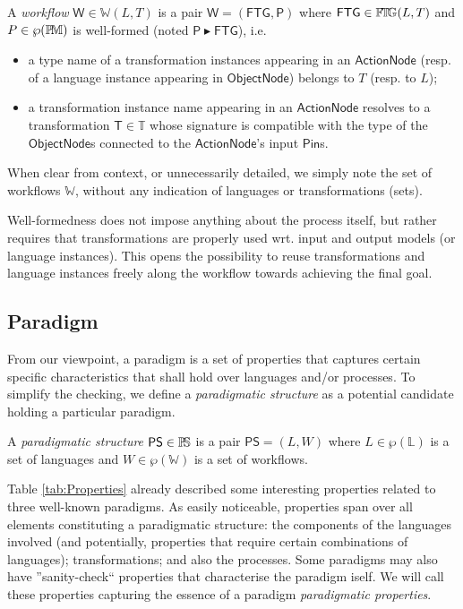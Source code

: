 \begin{Definition}[Workflow]
   A \emph{workflow} $\mathsf{W}\in\mathbb{W}(L, T)$ is a pair $\mathsf{W} = 
(\mathsf{FTG}, \mathsf{P})$ where $\mathsf{FTG}\in\mathbb{F}\!\mathbb{T}\!\mathbb{G}(L, T)$ and 
$P\in\wp(\mathbb{P}\!\mathbb{M})$ is well-formed (noted $\mathsf{P} \blacktriangleright 
\mathsf{FTG}$), i.e.
\begin{itemize}
   \item a type name of a transformation instances appearing in an
$\mathsf{ActionNode}$ (resp. of a language instance appearing in 
$\mathsf{ObjectNode}$) belongs to $T$ (resp. to $L$);
   \item a transformation instance name appearing in an $\mathsf{ActionNode}$
resolves to a transformation $\mathsf{T}\in\mathbb{T}$ whose signature is 
compatible with the type of the $\mathsf{ObjectNode}$s 
connected to the $\mathsf{ActionNode}$'s input $\mathsf{Pin}$s. 
\end{itemize}
\end{Definition}
\noindent
When clear from context, or unnecessarily detailed, we simply note the set of 
workflows $\mathbb{W}$, without any indication of languages or 
transformations (sets).

Well-formedness does not impose anything about the process itself, but rather 
requires that transformations are properly used wrt. input and output models 
(or language instances). This opens the possibility to reuse transformations 
and language instances freely along the workflow towards achieving the final 
goal.



\subsection{Paradigm}
\label{sec:PS}

From our viewpoint, a paradigm is a set of properties that captures 
certain specific characteristics that shall hold over languages and/or 
processes. To simplify the checking, we define a \emph{paradigmatic structure} 
as a potential candidate holding a particular paradigm.

\begin{Definition}
   A \emph{paradigmatic structure} $\mathsf{PS}\in \mathbb{P}\!\mathbb{S}$ is a pair $\mathsf{PS} 
= (L, W)$ where $L\in \wp(\mathbb{L})$ is a set of languages and 
$W \in \wp(\mathbb{W})$ is a set of workflows.
\end{Definition}

Table \ref{tab:Properties} already described some interesting properties 
related to three well-known paradigms. As easily noticeable, properties span 
over all elements constituting a paradigmatic structure: the components of the 
languages involved (and potentially, properties that require certain 
combinations of languages); transformations; and also the processes. Some 
paradigms may also have ''sanity-check`` properties that characterise the 
paradigm iself. We will call these properties capturing the essence of a 
paradigm \emph{paradigmatic properties}.

